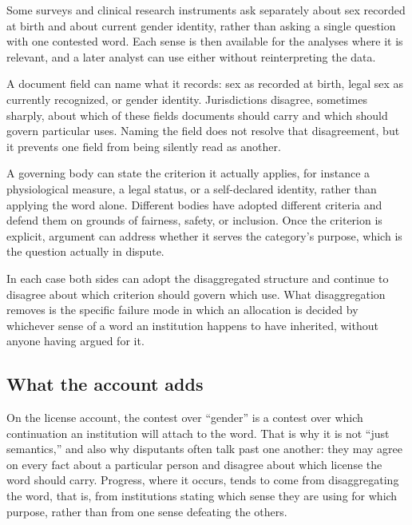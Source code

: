 \documentclass[11pt,a4paper]{article}
\theoremstyle{plain}
\theoremstyle{definition}
\theoremstyle{remark}
\begin{document}
\begin{description}[style=nextline,leftmargin=1.2em,itemsep=4pt]
\item[Research instruments.] Some surveys and clinical research instruments ask separately about sex recorded at birth and about current gender identity, rather than asking a single question with one contested word. Each sense is then available for the analyses where it is relevant, and a later analyst can use either without reinterpreting the data.
\item[Identity documents.] A document field can name what it records: sex as recorded at birth, legal sex as currently recognized, or gender identity. Jurisdictions disagree, sometimes sharply, about which of these fields documents should carry and which should govern particular uses. Naming the field does not resolve that disagreement, but it prevents one field from being silently read as another.
\item[Sports eligibility.] A governing body can state the criterion it actually applies, for instance a physiological measure, a legal status, or a self-declared identity, rather than applying the word alone. Different bodies have adopted different criteria and defend them on grounds of fairness, safety, or inclusion. Once the criterion is explicit, argument can address whether it serves the category's purpose, which is the question actually in dispute.
\end{description}

In each case both sides can adopt the disaggregated structure and continue to disagree about which criterion should govern which use. What disaggregation removes is the specific failure mode in which an allocation is decided by whichever sense of a word an institution happens to have inherited, without anyone having argued for it.

\subsection{What the account adds}

On the license account, the contest over ``gender'' is a contest over which continuation an institution will attach to the word. That is why it is not ``just semantics,'' and also why disputants often talk past one another: they may agree on every fact about a particular person and disagree about which license the word should carry. Progress, where it occurs, tends to come from disaggregating the word, that is, from institutions stating which sense they are using for which purpose, rather than from one sense defeating the others.
\end{document}
